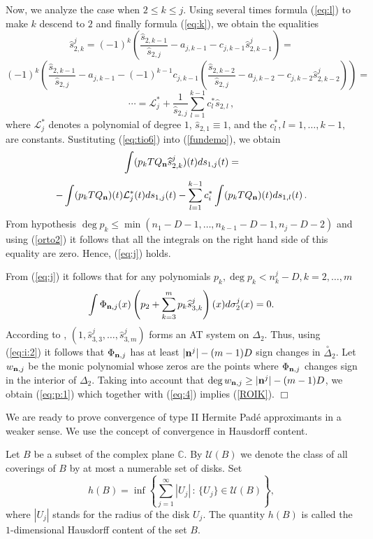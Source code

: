 \documentclass[10pt,a4paper]{article}
\theoremstyle{definition}
\theoremstyle{remark}
\numberwithin{equation}{section}
\begin{document}
Now, we analyze the case when $2 \leq k \leq j$. Using several
times formula (\ref{eq:l}) to make $k$ descend to $2$ and finally
formula (\ref{eq:k}), we obtain the equalities
\begin{equation} \label{eq:tio6} \widehat{s}^j_{2,k}  =
(-1)^k\left(\frac{\widehat{s} _{2,k-1}}{\widehat{s}_{2,j}}- a_{j,k-1} - c_{j,k-1}\widehat{s}^j_{2,k-1}\right) =
\end{equation}
\[ (-1)^k\left(\frac{\widehat{s} _{2,k-1}}{\widehat{s}_{2,j}}- a_{j,k-1}- (-1)^{k-1}c_{j,k-1}\left( \frac{\widehat{s} _{2,k-2} }{\widehat{s}_{2,j}}- a_{j,k-2} - c_{j,k-2}\widehat{s}^j_{2,k-2}\right)
\right) =\]
\[ \cdots =
{\mathcal{L}}_j^* + \frac{1}{\widehat{s}_{2,j}}\sum_{l=1}^{k-1} c_{l}^*
 \widehat{s}_{2,l}\,,
\]
where ${\mathcal{L}}_{j}^*$ denotes a polynomial of degree $1$,
$\widehat{s}_{2,1} \equiv 1$, and the $c_{l}^*, l= 1,\ldots,k-1,$ are
constants.
Sustituting (\ref{eq:tio6}) into (\ref{fundemo}), we obtain
\[
\int  (p_kTQ_{{\bf n}}\widehat{s}_{2,k}^j)(t) d
s_{1,j}(t) =
\]
\[
 -\int (p_kTQ_{{\bf n}})(t) {\mathcal{L}}_{j}^*(t) d
s_{1,j}(t) - \sum_{l=1}^{k-1}c_{i}^* \int  (p_kTQ_{{\bf n}})(t)d
s_{1,l}(t)\,.
\]
From hypothesis $\deg p_k   \leq
\min(n_1-D-1,\ldots,n_{k-1}-D-1,n_j-D-2)$ and using (\ref{orto2})  it follows that all the
integrals on the right hand side of this equality are zero. Hence, (\ref{eq:j}) holds.

From  (\ref{eq:j}) it follows that for any polynomials $p_k, \deg p_k < n_k^j-D, k=2, \ldots ,m$
\begin{equation} \label{eq:i:2}
\int   \Phi_{{\bf n},j}(x)\left(p_2 + \sum_{k=3}^m
p_k \widehat{s}_{3,k}^j\right)(x) d \sigma_2^j(x) =0.
\end{equation}
According to  \cite[Theorem 1.1]{FL4II}, $(1, \widehat{s}_{3,3}^j, \ldots ,\widehat{s}_{3,m}^j)$
forms an AT system on $\Delta_2$. Thus, using (\ref{eq:i:2}) it follows that
$\Phi_{{{\bf n}},j} $ has at least $|{{\bf n}}^j|-(m-1)D$ sign changes in
$\stackrel{\circ}{\Delta}_2$. Let $w_{{\bf n},j}$ be the monic
polynomial whose zeros are the points where $\Phi_{{{\bf n}},j} $
changes sign in the interior of $\Delta_2$.
Taking into account that $\deg w_{{\bf n},j}
\geq |{{\bf n}}^j|-(m-1)D$, we obtain (\ref{eq:p:1}) which together with
(\ref{eq:4}) implies (\ref{ROIK}).
\hfill $\Box$
\medskip

We are ready to prove convergence of type II Hermite Pad\'e approximants in a weaker sense. We use the concept of convergence in Hausdorff content.

Let $B$ be a subset of the complex plane $\mathbb{C}$. By
$\mathcal{U}(B)$ we denote the class of all coverings of $B$ by at
most a numerable set of disks. Set
$$
h(B)=\inf\left\{\sum_{j=1}^\infty
|U_j|\,:\,\{U_j\}\in\mathcal{U}(B)\right\},
$$
where $|U_j|$ stands for the radius of the disk $U_j$. The quantity
$h(B)$ is called the $1$-dimensional Hausdorff content of the
set $B$.
\end{document}
